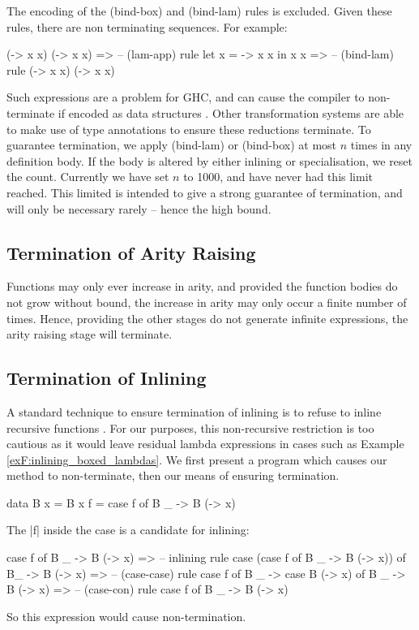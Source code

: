 The encoding of the (bind-box) and (bind-lam) rules is excluded. Given these rules, there are non terminating sequences. For example:

\ignore\begin{code}
(\x -> x x) (\x -> x x)
   => -- (lam-app) rule
let x = \x -> x x in x x
   => -- (bind-lam) rule
(\x -> x x) (\x -> x x)
\end{code}

Such expressions are a problem for GHC, and can cause the compiler to non-terminate if encoded as data structures \cite{spj:inlining}. Other transformation systems \cite{chin:higher_order_removal} are able to make use of type annotations to ensure these reductions terminate. To guarantee termination, we apply (bind-lam) or (bind-box) at most $n$ times in any definition body. If the body is altered by either inlining or specialisation, we reset the count. Currently we have set $n$ to 1000, and have never had this limit reached. This limited is intended to give a strong guarantee of termination, and will only be necessary rarely -- hence the high bound.

\subsection{Termination of Arity Raising}

Functions may only ever increase in arity, and provided the function bodies do not grow without bound, the increase in arity may only occur a finite number of times. Hence, providing the other stages do not generate infinite expressions, the arity raising stage will terminate.

\subsection{Termination of Inlining}

A standard technique to ensure termination of inlining is to refuse to inline recursive functions \cite{spj:inlining}. For our purposes, this non-recursive restriction is too cautious as it would leave residual lambda expressions in cases such as Example \ref{exF:inlining_boxed_lambdas}. We first present a program which causes our method to non-terminate, then our means of ensuring termination.

\begin{example}
\begin{code}
data B x = B x
f = case  f of
          B _ -> B (\x -> x)
\end{code}

The |f| inside the case is a candidate for inlining:

\ignore\begin{code}
case f of B _ -> B (\x -> x)
    => -- inlining rule
case (case f of B _ -> B (\x -> x)) of B_ -> B (\x -> x)
    => -- (case-case) rule
case f of B _ -> case B (\x -> x) of B _ -> B (\x -> x)
    => -- (case-con) rule
case f of B _ -> B (\x -> x)
\end{code}

\noindent So this expression would cause non-termination.
\end{example}

